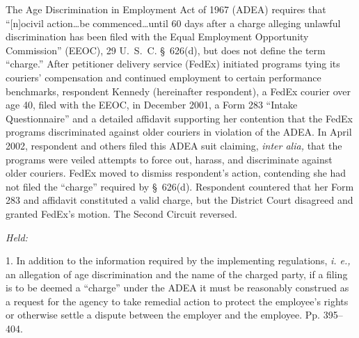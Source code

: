 
\setcounter{page}{389}

  The Age Discrimination in Employment Act of 1967 (ADEA) requires
that ``[n]ocivil action\dots be commenced\dots until 60 days
after a charge alleging unlawful discrimination has been filed with
the Equal Employment Opportunity Commission'' (EEOC), 29 U.~S.~C.
\S~626(d), but does not define the term ``charge.'' After
petitioner delivery service (FedEx) initiated programs tying its
couriers' compensation and continued employment to certain performance
benchmarks, respondent Kennedy (hereinafter respondent), a FedEx courier
over age 40, filed with the EEOC, in December 2001, a Form 283 ``Intake
Questionnaire'' and a detailed affidavit supporting her contention that
the FedEx programs discriminated against older couriers in violation
of the ADEA. In April 2002, respondent and others filed this ADEA suit
claiming, \emph{inter alia,} that the programs were veiled attempts to
force out, harass, and discriminate against older couriers. FedEx moved
to dismiss respondent's action, contending she had not filed the
``charge'' required by \S~626(d). Respondent countered that her Form
283 and affidavit constituted a valid charge, but the District Court
disagreed and granted FedEx's motion. The Second Circuit reversed.

\emph{Held:}

  1. In addition to the information required by the implementing
regulations, \emph{i. e.,} an allegation of age discrimination and the
name of the charged party, if a filing is to be deemed a ``charge''
under the ADEA it must be reasonably construed as a request for the
agency to take remedial action to protect the employee's rights or
otherwise settle a dispute between the employer and the employee. Pp.
395--404.

